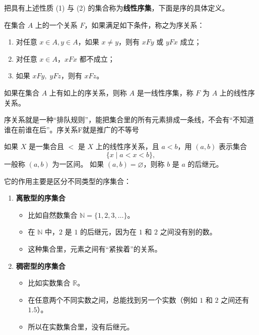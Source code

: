 把具有上述性质 (1) 与 (2) 的集合称为\textbf{线性序集}，下面是序的具体定义。
\begin{definition}[序关系]
在集合 $A$ 上的一个关系 $F$，如果满足如下条件，称之为序关系：
\begin{enumerate}
  \item 对任意 $x \in A, y \in A$，如果 $x \neq y$，则有 $xFy$ 或 $yFx$ 成立；
  \item 对任意 $x \in A$，$xFx$ 都不成立；
  \item 如果 $xFy, \; yFz$，则有 $xFz$。
\end{enumerate}
如果在集合 $A$ 上有如上的序关系，则称 $A$ 是一线性序集，称 $F$ 为 $A$ 上的线性序关系。
\end{definition}
序关系就是一种“排队规则”，能把集合里的所有元素排成一条线，不会有“不知道谁在前谁在后”。序关系F就是推广的不等号
\begin{definition}
如果 $X$ 是一集合且 $<$ 是 $X$ 上的线性序关系，且 $a < b$，用 $(a,b)$ 表示集合 
\[
\{x \mid a < x < b\},
\]
一般称 $(a,b)$ 为一区间。  
如果 $(a,b) = \varnothing$，则称 $b$ 是 $a$ 的后继元。
\end{definition}
它的作用主要是区分不同类型的序集合：
\begin{enumerate}
  \item \textbf{离散型的序集合}
  \begin{itemize}
    \item 比如自然数集合 $\mathbb{N}=\{1,2,3,\dots\}$。
    \item 在 $\mathbb{N}$ 中，$2$ 是 $1$ 的后继元，因为在 $1$ 和 $2$ 之间没有别的数。
    \item 这种集合里，元素之间有“紧挨着”的关系。
  \end{itemize}
  \item \textbf{稠密型的序集合}
  \begin{itemize}
    \item 比如实数集合 $\mathbb{R}$。
    \item 在任意两个不同实数之间，总能找到另一个实数（例如 $1$ 和 $2$ 之间还有 $1.5$）。
    \item 所以在实数集合里，没有后继元。
  \end{itemize}
\end{enumerate}

